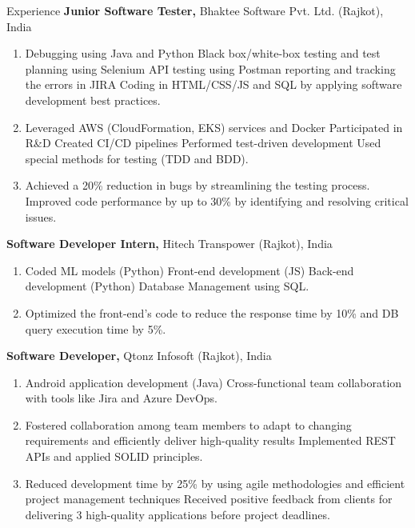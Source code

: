 \begin{rubric}{Experience}
%
	\textbf{Junior Software Tester,} Bhaktee Software Pvt. Ltd. (Rajkot), India
 
 \begin{enumerate}[noitemsep, topsep=0pt, left=-12em, labelwidth=12em]
     \item Debugging using Java and Python \textbullet{} Black box/white-box testing and test planning using Selenium \textbullet{} API testing using Postman  \textbullet{} reporting and tracking the errors in JIRA \textbullet{} Coding in HTML/CSS/JS and SQL by applying software development best practices.
     
     \item Leveraged AWS (CloudFormation, EKS) services and Docker \textbullet{} Participated in R\&D \textbullet{} Created CI/CD pipelines \textbullet{} Performed test-driven development \textbullet{} Used special methods for testing (TDD and BDD).

     \item Achieved a 20\% reduction in bugs by streamlining the testing process. Improved code performance by up to 30\% by identifying and resolving critical issues.
 \end{enumerate}
%
%
%
	\textbf{Software Developer Intern,} Hitech Transpower (Rajkot), India

  \begin{enumerate}[noitemsep, topsep=0pt, left=-12em, labelwidth=12em]
  \item Coded ML models (Python) \textbullet{} Front-end development (JS) \textbullet{} Back-end development (Python) \textbullet{} Database Management using SQL. 
  \item Optimized the front-end's code to reduce the response time by 10\% and DB query execution time by 5\%.
  \end{enumerate}
%
%
%
	\textbf{Software Developer,} Qtonz Infosoft (Rajkot), India

  \begin{enumerate}[noitemsep, topsep=0pt, left=-12em, labelwidth=12em]
  \item Android application development (Java) \textbullet{} Cross-functional team collaboration with tools like Jira and Azure DevOps. 
  \item Fostered collaboration among team members to adapt to changing requirements and efficiently deliver high-quality results \textbullet{} Implemented REST APIs and applied SOLID principles.
  \item Reduced development time by 25\% by using agile methodologies and efficient project management techniques \textbullet{} Received positive feedback from clients for delivering 3 high-quality applications before project deadlines.
  \end{enumerate}


\end{rubric}
